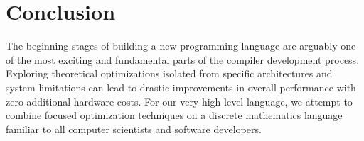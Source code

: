 \documentclass{article}
\begin{document}
\section{Conclusion}
The beginning stages of building a new programming language are arguably one of the most exciting and fundamental parts of the compiler development process. Exploring theoretical optimizations isolated from specific architectures and system limitations can lead to drastic improvements in overall performance with zero additional hardware costs. For our very high level language, we attempt to combine focused optimization techniques on a discrete mathematics language familiar to all computer scientists and software developers.


\pagebreak
\nocite{*} %
\printbibliography %
\end{document}
